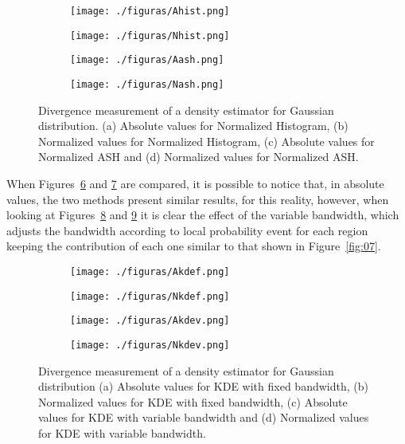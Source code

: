 \documentclass[conference]{IEEEtran}
\begin{document}
\begin{figure}[!h]
	\centering
	\begin{subfigure}{0.2\textwidth}
		\texttt{[image: ./figuras/Ahist.png]}
		\caption{}
		\label{fig:13a}
	\end{subfigure}
	\begin{subfigure}{0.2\textwidth}
		\texttt{[image: ./figuras/Nhist.png]}
		\caption{}
		\label{fig:13b}
	\end{subfigure}
	
	\begin{subfigure}{0.2\textwidth}
		\texttt{[image: ./figuras/Aash.png]}
		\caption{}
		\label{fig:13c}
	\end{subfigure}
	\begin{subfigure}{0.2\textwidth}
		\texttt{[image: ./figuras/Nash.png]}
		\caption{}
		\label{fig:13d}
	\end{subfigure}
	
	
	\caption{Divergence measurement of a density estimator for Gaussian distribution. (a) Absolute values for Normalized Histogram, (b) Normalized values for Normalized Histogram, (c) Absolute values for Normalized ASH and (d) Normalized values for Normalized ASH.}
	\label{fig:13}
\end{figure}



When Figures~\ref{fig:14a} and \ref{fig:14b} are compared, it is possible to notice that, in absolute values, the two methods present similar results, for this reality, however, when looking at Figures~\ref{fig:14c} and \ref{fig:14d} it is clear the effect of the variable bandwidth, which adjusts the bandwidth according to local probability event for each region keeping the contribution of each one similar to that shown in Figure~\ref{fig:07}.

\begin{figure}[!h]
	\centering
	\begin{subfigure}{0.2\textwidth}
		\texttt{[image: ./figuras/Akdef.png]}
		\caption{}
		\label{fig:14a}
	\end{subfigure}
	\begin{subfigure}{0.2\textwidth}
		\texttt{[image: ./figuras/Nkdef.png]}
		\caption{}
		\label{fig:14b}
	\end{subfigure}
	
	\begin{subfigure}{0.2\textwidth}
		\texttt{[image: ./figuras/Akdev.png]}
		\caption{}
		\label{fig:14c}
	\end{subfigure}
	\begin{subfigure}{0.2\textwidth}
		\texttt{[image: ./figuras/Nkdev.png]}
		\caption{}
		\label{fig:14d}
	\end{subfigure}
	
	
	\caption{Divergence measurement of a density estimator for Gaussian distribution (a) Absolute values for KDE with fixed bandwidth, (b) Normalized values for KDE with fixed bandwidth, (c) Absolute values for KDE with variable bandwidth and (d) Normalized values for KDE with variable bandwidth.}
	\label{fig:14}
\end{figure}
\end{document}

